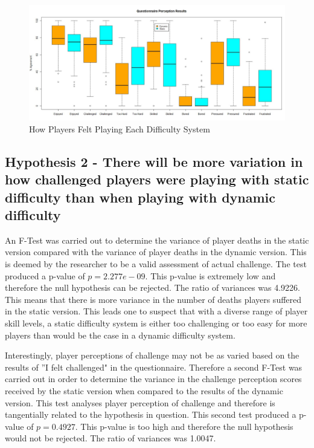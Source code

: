 \documentclass[journal]{IEEEtran}
\begin{document}
\begin{figure}[h]
	\includegraphics[width=1.0\linewidth]{questionnaireboxplot.jpg}
	\caption{How Players Felt Playing Each Difficulty System}
	\label{fig::6}
\end{figure} 





\subsection{Hypothesis 2 - There will be more variation in how challenged players were playing with static difficulty than when playing with dynamic difficulty}

An F-Test was carried out to determine the variance of player deaths in the static version compared with the variance of player deaths in the dynamic version. This is deemed by the researcher to be a valid assessment of actual challenge. The test produced a p-value of $p = 2.277e-09$. This p-value is extremely low and therefore the null hypothesis can be rejected. The ratio of variances was 4.9226. This means that there is more variance in the number of deaths players suffered in the static version. This leads one to suspect that with a diverse range of player skill levels, a static difficulty system is either too challenging or too easy for more players than would be the case in a dynamic difficulty system.

Interestingly, player perceptions of challenge may not be as varied based on the results of ''I felt challenged" in the questionnaire. Therefore a second F-Test was carried out in order to determine the variance in the challenge perception scores received by the static version when compared to the results of the dynamic version. This test analyses player perception of challenge and therefore is tangentially related to the hypothesis in question. This second test produced a p-value of $p = 0.4927$. This p-value is too high and therefore the null hypothesis would not be rejected. The ratio of variances was 1.0047.
\end{document}
